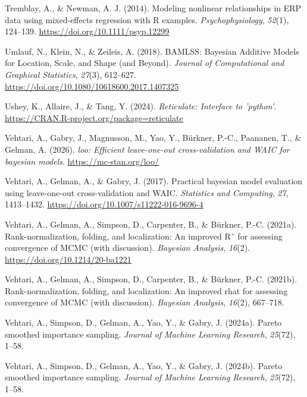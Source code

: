 \documentclass[
  doc,
  floatsintext,
  longtable,
  a4paper,
  nolmodern,
  notxfonts,
  notimes,
  colorlinks=true,linkcolor=blue,citecolor=blue,urlcolor=blue]{apa7}
\newlength{\cslhangindent}
\newenvironment{CSLReferences}[2] %
 {\begin{list}{}{%
  \setlength{\itemindent}{0pt}
  \setlength{\leftmargin}{0pt}
  \setlength{\parsep}{0pt}
  \ifodd #1
   \setlength{\leftmargin}{\cslhangindent}
   \setlength{\itemindent}{-1\cslhangindent}
  \fi
  \setlength{\itemsep}{#2\baselineskip}}}
 {\end{list}}
\begin{document}
\begin{CSLReferences}{1}{0}
Tremblay, A., \& Newman, A. J. (2014). Modeling nonlinear relationships
in ERP data using mixed{-}effects regression with R examples.
\emph{Psychophysiology}, \emph{52}(1), 124--139.
\url{https://doi.org/10.1111/psyp.12299}

Umlauf, N., Klein, N., \& Zeileis, A. (2018). BAMLSS: Bayesian Additive
Models for Location, Scale, and Shape (and Beyond). \emph{Journal of
Computational and Graphical Statistics}, \emph{27}(3), 612--627.
\url{https://doi.org/10.1080/10618600.2017.1407325}

Ushey, K., Allaire, J., \& Tang, Y. (2024). \emph{Reticulate: Interface
to 'python'}. \url{https://CRAN.R-project.org/package=reticulate}

Vehtari, A., Gabry, J., Magnusson, M., Yao, Y., Bürkner, P.-C.,
Paananen, T., \& Gelman, A. (2026). \emph{{loo}: Efficient leave-one-out
cross-validation and WAIC for bayesian models}.
\url{https://mc-stan.org/loo/}

Vehtari, A., Gelman, A., \& Gabry, J. (2017). Practical bayesian model
evaluation using leave-one-out cross-validation and WAIC.
\emph{Statistics and Computing}, \emph{27}, 1413--1432.
\url{https://doi.org/10.1007/s11222-016-9696-4}

Vehtari, A., Gelman, A., Simpson, D., Carpenter, B., \& Bürkner, P.-C.
(2021a). Rank-normalization, folding, and localization: An improved Rˆ
for assessing convergence of MCMC (with discussion). \emph{Bayesian
Analysis}, \emph{16}(2). \url{https://doi.org/10.1214/20-ba1221}

Vehtari, A., Gelman, A., Simpson, D., Carpenter, B., \& Bürkner, P.-C.
(2021b). Rank-normalization, folding, and localization: An improved rhat
for assessing convergence of MCMC (with discussion). \emph{Bayesian
Analysis}, \emph{16}(2), 667--718.

Vehtari, A., Simpson, D., Gelman, A., Yao, Y., \& Gabry, J. (2024a).
Pareto smoothed importance sampling. \emph{Journal of Machine Learning
Research}, \emph{25}(72), 1--58.

Vehtari, A., Simpson, D., Gelman, A., Yao, Y., \& Gabry, J. (2024b).
Pareto smoothed importance sampling. \emph{Journal of Machine Learning
Research}, \emph{25}(72), 1--58.


\end{CSLReferences}
\end{document}
